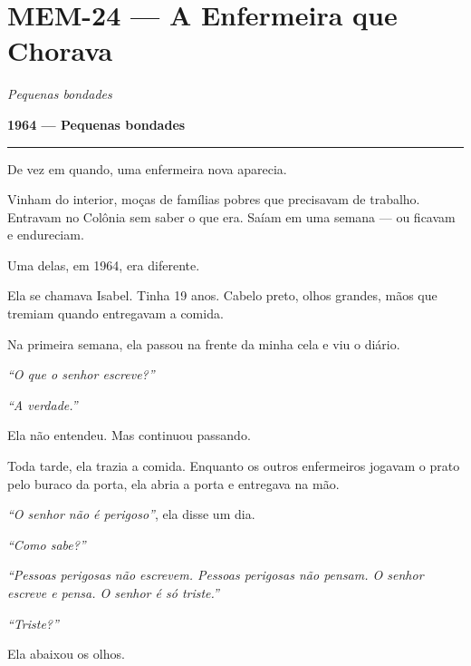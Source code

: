 \section*{\textbf{MEM-24} --- A Enfermeira que Chorava}

\noindent \textit{Pequenas bondades}

\noindent \textbf{1964 --- Pequenas bondades}

\vspace{0.5em}\noindent\rule{\textwidth}{0.5pt}\vspace{0.5em}

\noindent De vez em quando, uma enfermeira nova aparecia.

\noindent Vinham do interior, moças de famílias pobres que precisavam de trabalho. Entravam no Colônia sem saber o que era. Saíam em uma semana --- ou ficavam e endureciam.

\noindent Uma delas, em 1964, era diferente.

\noindent Ela se chamava Isabel. Tinha 19 anos. Cabelo preto, olhos grandes, mãos que tremiam quando entregavam a comida.

\noindent Na primeira semana, ela passou na frente da minha cela e viu o diário.

\noindent \textit{\textquotedblleft{}O que o senhor escreve?\textquotedblright{}}

\noindent \textit{\textquotedblleft{}A verdade.\textquotedblright{}}

\noindent Ela não entendeu. Mas continuou passando.

\noindent Toda tarde, ela trazia a comida. Enquanto os outros enfermeiros jogavam o prato pelo buraco da porta, ela abria a porta e entregava na mão.

\noindent \textit{\textquotedblleft{}O senhor não é perigoso\textquotedblright{}}, ela disse um dia.

\noindent \textit{\textquotedblleft{}Como sabe?\textquotedblright{}}

\noindent \textit{\textquotedblleft{}Pessoas perigosas não escrevem. Pessoas perigosas não pensam. O senhor escreve e pensa. O senhor é só triste.\textquotedblright{}}

\noindent \textit{\textquotedblleft{}Triste?\textquotedblright{}}

\noindent Ela abaixou os olhos.

